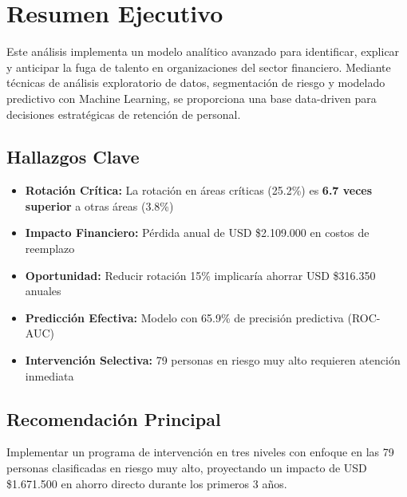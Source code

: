 \documentclass[11pt,a4paper,twoside]{article}
\begin{document}
\newpage

\section*{Resumen Ejecutivo}

Este análisis implementa un modelo analítico avanzado para identificar, explicar y anticipar la fuga de talento en organizaciones del sector financiero. Mediante técnicas de análisis exploratorio de datos, segmentación de riesgo y modelado predictivo con Machine Learning, se proporciona una base data-driven para decisiones estratégicas de retención de personal.

\subsection*{Hallazgos Clave}

\begin{itemize}
    \item \textbf{Rotación Crítica:} La rotación en áreas críticas (25.2\%) es \textbf{6.7 veces superior} a otras áreas (3.8\%)
    \item \textbf{Impacto Financiero:} Pérdida anual de USD \$2.109.000 en costos de reemplazo
    \item \textbf{Oportunidad:} Reducir rotación 15\% implicaría ahorrar USD \$316.350 anuales
    \item \textbf{Predicción Efectiva:} Modelo con 65.9\% de precisión predictiva (ROC-AUC)
    \item \textbf{Intervención Selectiva:} 79 personas en riesgo muy alto requieren atención inmediata
\end{itemize}

\subsection*{Recomendación Principal}

Implementar un programa de intervención en tres niveles con enfoque en las 79 personas clasificadas en riesgo muy alto, proyectando un impacto de USD \$1.671.500 en ahorro directo durante los primeros 3 años.

\newpage

\tableofcontents
\newpage
\end{document}

